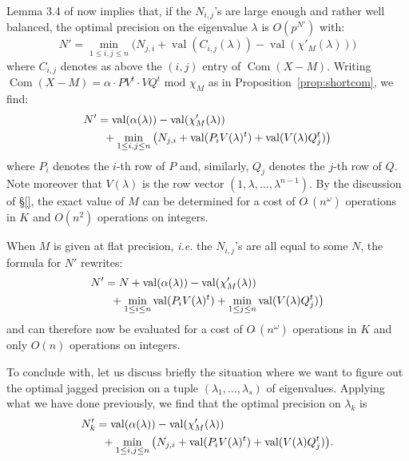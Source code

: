 \documentclass{sig-alternate-05-2015}
\DeclareMathOperator{\val}{val}
\DeclareMathOperator{\com}{Com}
\newcommand{\softO}{O\tilde{~}}
\begin{document}
\noindent
Lemma 3.4 of \cite{caruso-roe-vaccon:14a} now implies that, if the
$N_{i,j}$'s are large enough and rather well balanced, the optimal
precision on the eigenvalue $\lambda$ is $O(p^{N'})$ with:
$$N' = \min_{1 \leq i, j\leq n} \big(N_{j,i} + \val(C_{i,j}(\lambda)) - 
\val(\chi'_M(\lambda))\big)$$
where $C_{i,j}$ denotes as above the $(i,j)$ entry of $\com(X{-}M)$.
Writing
$\com(X{-}M) = \alpha \cdot P V^t \cdot V Q^t \text{ mod } \chi_M$
as in Proposition~\ref{prop:shortcom}, we find:
\begin{align*}
N' & = \val(\alpha(\lambda)) - \val(\chi'_M(\lambda)) \\
& \hspace{2mm} + \min_{1 \leq i, j\leq n} \big(N_{j,i} + 
\val(P_i V(\lambda)^t) + \val(V(\lambda) Q_j^t)\big)
\end{align*}
where $P_i$ denotes the $i$-th row of $P$ and, similarly, $Q_j$
denotes the $j$-th row of $Q$. Note moreover that $V(\lambda)$ is
the row vector $(1, \lambda, \ldots, \lambda^{n-1})$.
By the discussion of \S \ref{}, the exact value of $M$ can be 
determined for a cost of $\softO(n^\omega)$ operations in $K$ and
$O(n^2)$ operations on integers. 

When $M$ is given at flat precision, \emph{i.e.} the $N_{i,j}$'s are all 
equal to some $N$, the formula for $N'$ rewrites:
\begin{align*}
N' & = N + \val(\alpha(\lambda)) - \val(\chi'_M(\lambda)) \\
& \hspace{2mm} + \min_{1 \leq i \leq n} \val(P_i V(\lambda)^t)
+ \min_{1 \leq j \leq n} \val(V(\lambda) Q_j^t)\big)
\end{align*}
and can therefore now be evaluated for a cost of $\softO(n^\omega)$
operations in $K$ and only $O(n)$ operations on integers.

\medskip

To conclude with, let us discuss briefly the situation where we want
to figure out the optimal jagged precision on a tuple $(\lambda_1,
\ldots, \lambda_s)$ of eigenvalues. Applying what we have done
previously, we find that the optimal precision on $\lambda_k$ is 
\begin{align*}
N'_k & = \val(\alpha(\lambda)) - \val(\chi'_M(\lambda)) \\
& \hspace{2mm} + \min_{1 \leq i, j\leq n} \big(N_{j,i} + 
\val(P_i V(\lambda)^t) + \val(V(\lambda) Q_j^t)\big).
\end{align*}
\end{document}
